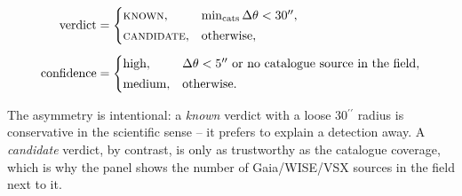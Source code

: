 \documentclass[11pt,a4paper]{article}
\newcommand{\arcsec}{\ensuremath{{}^{\prime\prime}}}
\begin{document}
\begin{equation}
\begin{aligned}
  \text{verdict} &=
  \begin{cases}
    \textsc{known}, & \min_{\text{cats}} \Delta\theta < 30\arcsec,\\[2pt]
    \textsc{candidate}, & \text{otherwise},
  \end{cases}\\[4pt]
  \text{confidence} &=
  \begin{cases}
    \text{high}, & \Delta\theta < 5\arcsec \ \text{or no catalogue source in the field},\\[2pt]
    \text{medium}, & \text{otherwise}.
  \end{cases}
\end{aligned}
\label{eq:verdict}
\end{equation}

The asymmetry is intentional: a \emph{known} verdict with a loose $30\arcsec$ radius is conservative
in the scientific sense -- it prefers to explain a detection away. A \emph{candidate} verdict, by
contrast, is only as trustworthy as the catalogue coverage, which is why the panel shows the number
of Gaia/WISE/VSX sources in the field next to it.
\end{document}

